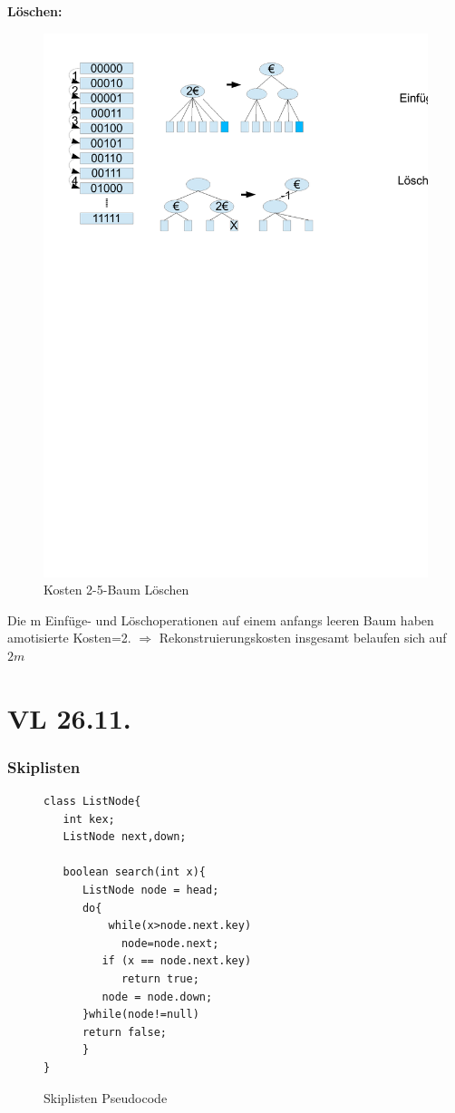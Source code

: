 \documentclass[a4paper,twoside,10pt]{report}
\begin{document}
\textbf{Löschen:}
\begin{figure}[H]\center
\includegraphics[trim=  6cm 18.5cm 6cm 7cm,clip,width=.8\columnwidth]{figures/zaehler.pdf}
\caption{Kosten 2-5-Baum Löschen}
\end{figure}

Die m Einfüge- und Löschoperationen auf einem anfangs leeren Baum haben amotisierte Kosten=2.
$\Rightarrow$ Rekonstruierungskosten insgesamt belaufen sich auf $2m$

\chapter{VL 26.11.}
\subsection{Skiplisten}
\begin{figure}[H]
\begin{verbatim}
class ListNode{
   int kex;
   ListNode next,down;

   boolean search(int x){
      ListNode node = head;
      do{
          while(x>node.next.key)
            node=node.next;
         if (x == node.next.key)
            return true;
         node = node.down; 
      }while(node!=null)
      return false;
      }
}
\end{verbatim}
\caption{Skiplisten Pseudocode}
\end{figure}
\end{document}
